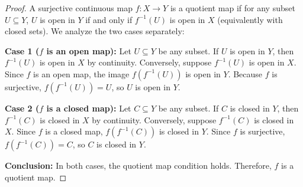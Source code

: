 
\begin{proof}
A surjective continuous map $f\colon X\to Y$ is a quotient map if for any subset
$U\subseteq Y$, $U$ is open in $Y$ if and only if $f^{-1}(U)$ is open in $X$ (equivalently with
closed sets). We analyze the two cases separately:

\textbf{Case 1 ($f$ is an open map):} Let $U\subseteq Y$ be any subset. If $U$ is open in $Y$,
then $f^{-1}(U)$ is open in $X$ by continuity. Conversely, suppose $f^{-1}(U)$ is open in $X$.
Since $f$ is an open map, the image $f(f^{-1}(U))$ is open in $Y$. Because $f$ is surjective,
$f(f^{-1}(U))=U$, so $U$ is open in $Y$.

\textbf{Case 2 ($f$ is a closed map):} Let $C\subseteq Y$ be any subset. If $C$ is closed in
$Y$, then $f^{-1}(C)$ is closed in $X$ by continuity. Conversely, suppose $f^{-1}(C)$ is closed
in $X$. Since $f$ is a closed map, $f(f^{-1}(C))$ is closed in $Y$. Since $f$ is surjective,
$f(f^{-1}(C))=C$, so $C$ is closed in $Y$.

\textbf{Conclusion:} In both cases, the quotient map condition holds. Therefore, $f$ is a
quotient map.
\end{proof}
